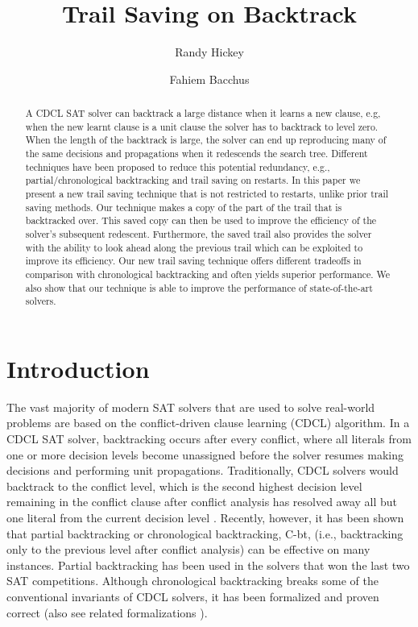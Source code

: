 \documentclass[runningheads]{llncs}
\title{Trail Saving on Backtrack}
\author{Randy Hickey \and Fahiem Bacchus}
\institute{Department of Computer Science, University of Toronto, Canada\\
  \email{rhickey@cs.toronto.edu, fbacchus@cs.toronto.edu}}
\newcommand{\sat}{SAT\xspace}
\newcommand{\cbt}{C-bt\xspace}
\begin{document}
\maketitle
\begin{abstract}
    A CDCL \sat solver can backtrack a large distance when it learns a
    new clause, e.g, when the new learnt clause is a unit clause the
    solver has to backtrack to level zero. When the length of the
    backtrack is large, the solver can end up reproducing many of the
    same decisions and propagations when it redescends the search
    tree. Different techniques have been proposed to reduce this
    potential redundancy, e.g., partial/chronological backtracking and
    trail saving on restarts. In this paper we present a new trail
    saving technique that is not restricted to restarts, unlike prior
    trail saving methods. Our technique makes a copy of the part of
    the trail that is backtracked over. This saved copy can then be
    used to improve the efficiency of the solver's subsequent
    redescent. Furthermore, the saved trail also provides the solver
    with the ability to look ahead along the previous trail which can
    be exploited to improve its efficiency. Our new trail saving
    technique offers different tradeoffs in comparison with
    chronological backtracking and often yields superior performance.
    We also show that our technique is able to improve the performance
    of state-of-the-art solvers.
\end{abstract}

\section{Introduction}
The vast majority of modern SAT solvers that are used to solve
real-world problems are based on the conflict-driven clause learning
(CDCL) algorithm. In a CDCL SAT solver, backtracking occurs after
every conflict, where all literals from one or more decision levels
become unassigned before the solver resumes making decisions and
performing unit propagations. Traditionally, CDCL solvers would
backtrack to the conflict level, which is the second highest decision
level remaining in the conflict clause after conflict analysis has
resolved away all but one literal from the current decision level
\cite{DBLP:conf/dac/MoskewiczMZZM01}. Recently, however, it has been
shown that partial backtracking \cite{DBLP:conf/lpar/JiangZ13} or
chronological backtracking, \cbt, (i.e., backtracking only to the
previous level after conflict analysis)
\cite{DBLP:conf/sat/NadelR18,DBLP:conf/sat/MohleB19} can be effective
on many instances. Partial backtracking has been used in the solvers
that won the last two SAT competitions. Although chronological
backtracking breaks some of the conventional invariants of CDCL
solvers, it has been formalized and proven correct
\cite{DBLP:conf/sat/MohleB19} (also see related formalizations 
\cite{DBLP:journals/jacm/NieuwenhuisOT06,nadelPhD}).
\end{document}
